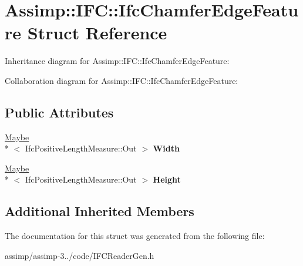 \hypertarget{struct_assimp_1_1_i_f_c_1_1_ifc_chamfer_edge_feature}{\section{Assimp\+:\+:I\+F\+C\+:\+:Ifc\+Chamfer\+Edge\+Feature Struct Reference}
\label{struct_assimp_1_1_i_f_c_1_1_ifc_chamfer_edge_feature}
}


Inheritance diagram for Assimp\+:\+:I\+F\+C\+:\+:Ifc\+Chamfer\+Edge\+Feature\+:


Collaboration diagram for Assimp\+:\+:I\+F\+C\+:\+:Ifc\+Chamfer\+Edge\+Feature\+:
\subsection*{Public Attributes}
\begin{DoxyCompactItemize}
\item 
\hypertarget{struct_assimp_1_1_i_f_c_1_1_ifc_chamfer_edge_feature_afa9c289aad1296a651b61ce531553de1}{\hyperlink{struct_assimp_1_1_s_t_e_p_1_1_maybe}{Maybe}\\*
$<$ Ifc\+Positive\+Length\+Measure\+::\+Out $>$ {\bfseries Width}}\label{struct_assimp_1_1_i_f_c_1_1_ifc_chamfer_edge_feature_afa9c289aad1296a651b61ce531553de1}

\item 
\hypertarget{struct_assimp_1_1_i_f_c_1_1_ifc_chamfer_edge_feature_acf9e380c1cf362988e8a7b728dc2ad9c}{\hyperlink{struct_assimp_1_1_s_t_e_p_1_1_maybe}{Maybe}\\*
$<$ Ifc\+Positive\+Length\+Measure\+::\+Out $>$ {\bfseries Height}}\label{struct_assimp_1_1_i_f_c_1_1_ifc_chamfer_edge_feature_acf9e380c1cf362988e8a7b728dc2ad9c}

\end{DoxyCompactItemize}
\subsection*{Additional Inherited Members}


The documentation for this struct was generated from the following file\+:\begin{DoxyCompactItemize}
\item 
assimp/assimp-\/3../code/I\+F\+C\+Reader\+Gen.\+h\end{DoxyCompactItemize}
